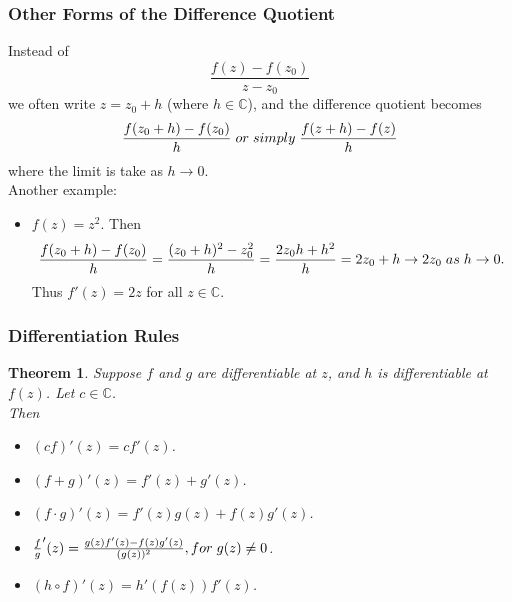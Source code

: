 \documentclass{article}
\newtheorem{theorem}{Theorem}[section]
\begin{document}
\subsubsection{Other Forms of the Difference Quotient}
Instead of
\begin{equation*}
\frac{f(z) - f(z_0)}{z - z_0}
\end{equation*}
we often write $z = z_0 + h$ (where $h \in \mathbb{C}$), and the difference quotient becomes
\begin{equation*}
\frac{f(z_0 + h) - f(z_0)}{h} \hspace{0.1cm} or \hspace{0.1cm} simply \hspace{0.1cm} \frac{f(z + h) - f(z)}{h}
\end{equation*}
where the limit is take as $h \to 0$. \\
Another example:
\begin{itemize}
\item $f(z) = z^2$. Then
\begin{equation*}
\frac{f(z_0 + h) - f(z_0)}{h} = \frac{(z_0 + h)^2 - z_0^2}{h} = \frac{2z_0h + h^2}{h} = 2z_0 + h \to 2z_0 \hspace{0.1cm} as \hspace{0.1cm} h \to 0.
\end{equation*}
Thus $f'(z) = 2z$ for all $z \in \mathbb{C}$.
\end{itemize}

\subsubsection{Differentiation Rules}
\begin{theorem}
Suppose $f$ and $g$ are differentiable at $z$, and $h$ is differentiable at $f(z)$. Let $c \in \mathbb{C}$.\\
Then
\begin{itemize}
\item $(cf)'(z) = cf'(z)$.
\item $(f + g)'(z) = f'(z) + g'(z)$.
\item $(f \cdot g)'(z) = f'(z)g(z) + f(z)g'(z)$.
\item $\frac{f}{g}'(z) = \frac{g(z)f'(z) - f(z)g'(z)}{(g(z))^2}, for \hspace{0.1cm} g(z) \neq 0$.
\item $(h \circ f)'(z) = h'(f(z))f'(z)$.
\end{itemize}
\end{theorem}
\end{document}
